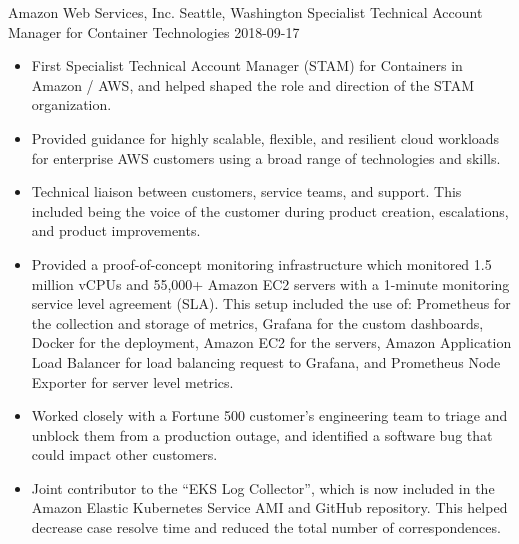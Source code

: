 \roleheader
    {Amazon Web Services, Inc.}
    {Seattle, Washington}
    {Specialist Technical Account Manager for Container Technologies}
    {2018-09-17}
    {}

\begin{itemize}
    \item First Specialist Technical Account Manager (STAM) for Containers in Amazon / AWS, and helped shaped the role and direction of the STAM organization.
    \item Provided guidance for highly scalable, flexible, and resilient cloud workloads for enterprise AWS customers using a broad range of technologies and skills.
    \item Technical liaison between customers, service teams, and support. This included being the voice of the customer during product creation, escalations, and product improvements.
    \item Provided a proof-of-concept monitoring infrastructure which monitored 1.5 million vCPUs and 55,000+ Amazon EC2 servers with a 1-minute monitoring service level agreement (SLA). This setup included the use of: Prometheus for the collection and storage of metrics, Grafana for the custom dashboards, Docker for the deployment, Amazon EC2 for the servers, Amazon Application Load Balancer for load balancing request to Grafana, and Prometheus Node Exporter for server level metrics.
    \item Worked closely with a Fortune 500 customer's engineering team to triage and unblock them from a production outage, and identified a software bug that could impact other customers.
    \item Joint contributor to the ``EKS Log Collector'', which is now included in the Amazon Elastic Kubernetes Service AMI and GitHub repository. This helped decrease case resolve time and reduced the total number of correspondences.
\end{itemize}